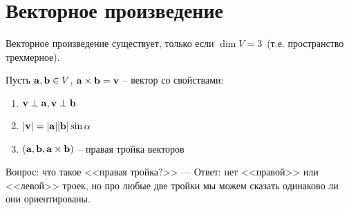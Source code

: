 \documentclass[main]{subfiles}
\begin{document}
\chapter{Векторное произведение}
\begin{remark}
    Векторное произведение существует, только если $\dim V = 3$~(т.е. пространство
    трехмерное).
\end{remark}

\begin{definition}[Формальное]
    Пусть $\mathbf{a}, \mathbf{b} \in V$, $\mathbf{a} \times \mathbf{b} = \mathbf{v}$ -- вектор со свойствами:
    \begin{enumerate}
        \item $\mathbf{v} \perp \mathbf{a}, \mathbf{v} \perp \mathbf{b}$
        \item $|\mathbf{v}| = |\mathbf{a}| |\mathbf{b}| \sin \alpha$
        \item $(\mathbf{a}, \mathbf{b}, \mathbf{a} \times \mathbf{b})$ -- правая тройка векторов
    \end{enumerate}
\end{definition}

Вопрос: что такое <<правая тройка?>> --- Ответ: нет <<правой>> или <<левой>> троек,
но про любые две тройки мы можем сказать одинаково ли они ориентированы.
\end{document}
